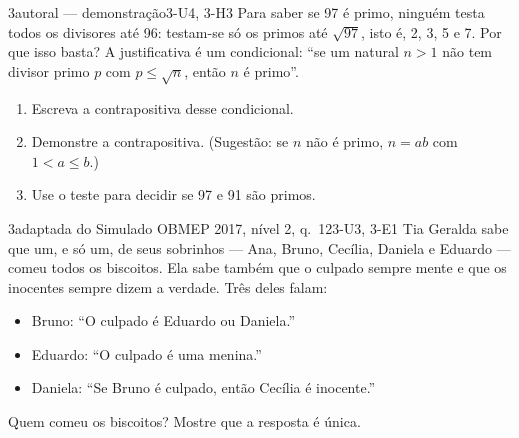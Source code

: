 \begin{questao}{3}{autoral — demonstração}{3-U4, 3-H3}\label{u3:q12}
Para saber se 97 é primo, ninguém testa todos os divisores até 96: testam-se só os primos até $\sqrt{97}$, isto é, 2, 3, 5 e 7. Por que isso basta? A justificativa é um condicional: \enquote{se um natural $n>1$ não tem divisor primo $p$ com $p\le\sqrt n$, então $n$ é primo}.
\begin{enumerate}[label=\alph*)]
  \item Escreva a contrapositiva desse condicional.
  \item Demonstre a contrapositiva. (Sugestão: se $n$ não é primo, $n=ab$ com $1<a\le b$.)
  \item Use o teste para decidir se 97 e 91 são primos.
\end{enumerate}
\end{questao}

\begin{questao}{3}{adaptada do Simulado OBMEP 2017, nível 2, q.~12}{3-U3, 3-E1}\label{u3:q13}
Tia Geralda sabe que um, e só um, de seus sobrinhos — Ana, Bruno, Cecília, Daniela e Eduardo — comeu todos os biscoitos. Ela sabe também que o culpado sempre mente e que os inocentes sempre dizem a verdade. Três deles falam:
\begin{itemize}
  \item Bruno: \enquote{O culpado é Eduardo ou Daniela.}
  \item Eduardo: \enquote{O culpado é uma menina.}
  \item Daniela: \enquote{Se Bruno é culpado, então Cecília é inocente.}
\end{itemize}
Quem comeu os biscoitos? Mostre que a resposta é única.
\end{questao}

